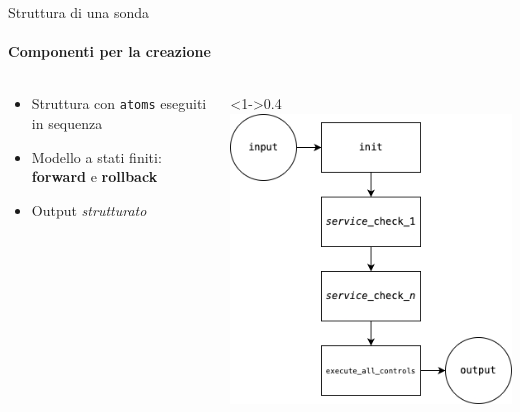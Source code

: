 \documentclass{beamer}
\begin{document}
\begin{frame}{Struttura di una sonda}
    \framesubtitle{Componenti per la creazione}
    \begin{columns}
        \begin{column}{0.6\textwidth}
            \begin{itemize}
                \item <1-> Struttura con \texttt{atoms} eseguiti in sequenza
                \item <2-> Modello a stati finiti: \textbf{forward} e \textbf{rollback}
                \item <3-> Output \emph{strutturato}
            \end{itemize}
        \end{column}
        \begin{column}<1->{0.4\textwidth}
            \includegraphics[width=\textwidth]{assets/flow.drawio.png}
        \end{column}
    \end{columns}
\end{frame}
\end{document}
